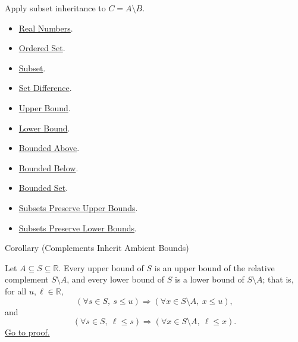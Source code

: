\begin{remark*}[Interpretation]
Apply subset inheritance to $C=A\setminus B$.
\end{remark*}

\begin{dependencies}
\begin{itemize}
\item \hyperref[def:reals]{Real Numbers}.
\item \hyperref[def:ordered-set]{Ordered Set}.
\item \hyperref[def:subset]{Subset}.
\item \hyperref[def:set-difference]{Set Difference}.
\item \hyperref[def:real-upper-bound]{Upper Bound}.
\item \hyperref[def:real-lower-bound]{Lower Bound}.
\item \hyperref[def:bounded-above]{Bounded Above}.
\item \hyperref[def:bounded-below]{Bounded Below}.
\item \hyperref[def:bounded]{Bounded Set}.
\item \hyperref[lem:subsets-preserve-upper-bounds]{Subsets Preserve Upper Bounds}.
\item \hyperref[lem:subsets-preserve-lower-bounds]{Subsets Preserve Lower Bounds}.
\end{itemize}
\end{dependencies}

\begin{corollarybox}{Corollary (Complements Inherit Ambient Bounds)}
\begin{corollary}
\label{cor:complements-inherit-ambient-bounds}
Let $A\subseteq S\subseteq\mathbb{R}$. Every upper bound of $S$ is an
upper bound of the relative complement $S\setminus A$, and every lower
bound of $S$ is a lower bound of $S\setminus A$; that is, for all
$u,\ell\in\mathbb{R}$,
\[
\left(\forall s\in S,\ s\leq u\right)
\Longrightarrow
(\forall x\in S\setminus A,\ x\leq u),
\]
and
\[
\left(\forall s\in S,\ \ell\leq s\right)
\Longrightarrow
(\forall x\in S\setminus A,\ \ell\leq x).
\]
\hyperref[prf:complements-inherit-ambient-bounds]{Go to proof.}
\end{corollary}
\end{corollarybox}

